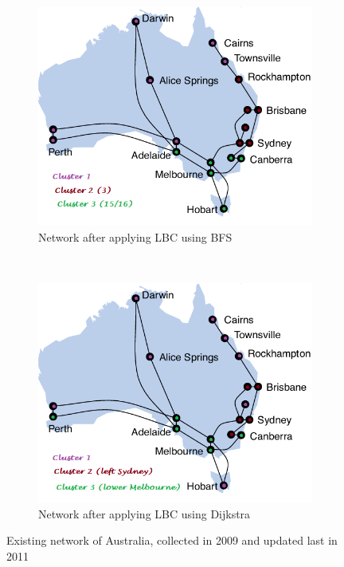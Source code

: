 \documentclass{article}
\begin{document}
\begin{figure}
 		~
 		\begin{subfigure}[b]{0.45\textwidth}
 			\includegraphics[width=\linewidth]{Images/aarnet2009_with_bfs.png}
 			\caption{Network after applying LBC using BFS}
 			\label{fig:aarnet2009bfs}
 		\end{subfigure}
 		~
 		\begin{subfigure}[b]{0.45\textwidth}
 			\includegraphics[width=\linewidth]{Images/aarnet2009_with_dijkstra.png}
 			\caption{Network after applying LBC using Dijkstra}
 			\label{fig:aarnet2009Dijkstra}
 		\end{subfigure}
 		\caption{Existing network of Australia, collected in 2009 and updated last in 2011}
 	\end{figure}
	 
\end{document}
